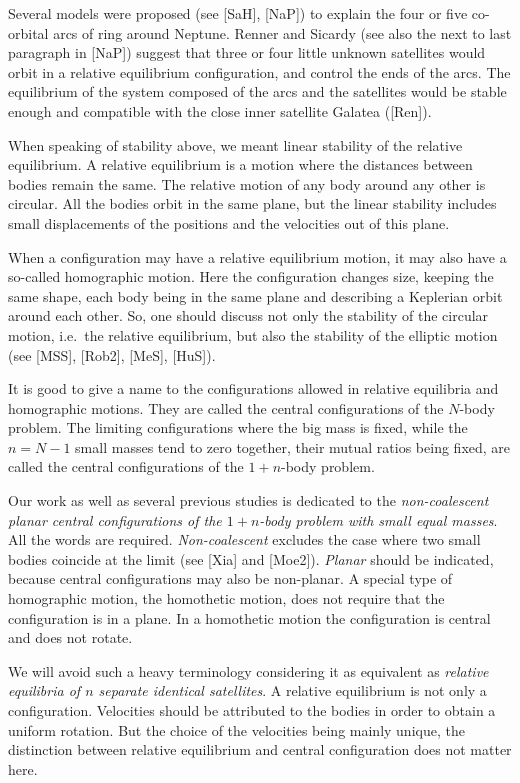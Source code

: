 \documentclass[11pt]{article}
\begin{document}
Several models were proposed (see [SaH], [NaP]) to explain the four
or five co-orbital arcs of ring around Neptune. Renner and Sicardy
(see also the next to last paragraph in [NaP]) suggest that three or
four little unknown satellites would orbit in a relative equilibrium
configuration, and control the ends of the arcs. The equilibrium of
the system composed of the arcs and the satellites would be stable
enough and compatible with the close inner satellite Galatea ([Ren]).

When speaking of stability above, we meant linear stability of the
relative equilibrium. A relative equilibrium is a motion where the
distances between bodies remain the same. The relative motion of
any body around any other is circular. All the bodies orbit
in the same plane, but the linear stability includes small
displacements of the positions and the velocities out of this plane.

When a configuration may have a relative equilibrium motion, it may
also have a so-called homographic motion. Here the configuration
changes size, keeping the same shape, each body being in the same
plane and describing a Keplerian orbit around each other. So, one
should discuss not only the stability of the circular motion, i.e.\
the relative equilibrium, but also the stability of the elliptic motion
(see [MSS], [Rob2], [MeS], [HuS]).

It is good to give a name to the configurations allowed in relative
equilibria and homographic motions. They are called the central
configurations of the $N$-body problem. The limiting configurations where the big mass is fixed, while the $n=N-1$ small masses tend to zero together, their mutual ratios being fixed, are called the central configurations of the $1+n$-body problem.

Our work as well as several previous studies is dedicated to the
{\sl non-coales\-cent planar central configurations of the $1+n$-body
problem with small equal masses}. All the words are required. {\sl
Non-coalescent} excludes the case where two small bodies coincide at
the limit (see [Xia] and [Moe2]). {\sl Planar} should be indicated,
because central configurations may also be non-planar. A special
type of homographic motion, the homothetic motion, does not
require that the configuration is in a plane. In a homothetic motion
the configuration is central and does not rotate.

We will avoid such a heavy terminology considering it as equivalent
as {\sl relative equilibria of $n$ separate identical satellites}.
A relative equilibrium is not only a configuration. Velocities
should be attributed to the bodies in order to obtain a uniform
rotation. But the choice of the velocities being mainly
unique, the distinction between relative equilibrium and central
configuration does not matter here.
\end{document}

